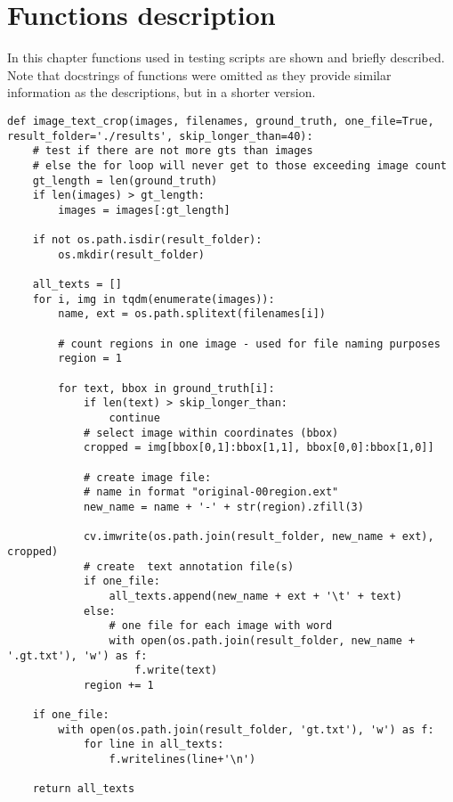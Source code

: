 \chapter{Functions description}

In this chapter functions used in testing scripts are shown and briefly described. Note that docstrings of functions were omitted as they provide similar information as the descriptions, but in a shorter version.                                                    

\begin{lstlisting}[caption=image\_text\_crop]
def image_text_crop(images, filenames, ground_truth, one_file=True, result_folder='./results', skip_longer_than=40):
    # test if there are not more gts than images
    # else the for loop will never get to those exceeding image count
    gt_length = len(ground_truth)
    if len(images) > gt_length:
        images = images[:gt_length]

    if not os.path.isdir(result_folder):
        os.mkdir(result_folder)
    
    all_texts = []
    for i, img in tqdm(enumerate(images)):
        name, ext = os.path.splitext(filenames[i])

        # count regions in one image - used for file naming purposes
        region = 1
        
        for text, bbox in ground_truth[i]:
            if len(text) > skip_longer_than:
                continue
            # select image within coordinates (bbox)
            cropped = img[bbox[0,1]:bbox[1,1], bbox[0,0]:bbox[1,0]]

            # create image file:
            # name in format "original-00region.ext"
            new_name = name + '-' + str(region).zfill(3)

            cv.imwrite(os.path.join(result_folder, new_name + ext), cropped)
            # create  text annotation file(s)
            if one_file:
                all_texts.append(new_name + ext + '\t' + text)
            else:
                # one file for each image with word
                with open(os.path.join(result_folder, new_name + '.gt.txt'), 'w') as f:
                    f.write(text)
            region += 1
    
    if one_file:
        with open(os.path.join(result_folder, 'gt.txt'), 'w') as f:
            for line in all_texts:
                f.writelines(line+'\n')

    return all_texts
\end{lstlisting}


